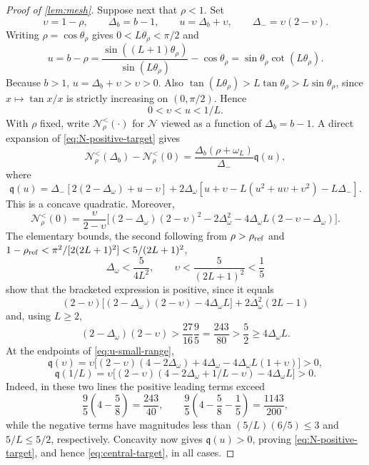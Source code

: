 \documentclass[review,hidelinks,onefignum,onetabnum]{siamart251216}
\begin{document}
\begin{proof}[Proof of \cref{lem:mesh}]
Suppose next that \(\rho<1\).  Set
\[
 \upsilon=1-\rho,\qquad \Delta_b=b-1,\qquad
 u=\Delta_b+\upsilon,\qquad \Delta_-=\upsilon(2-\upsilon).
\]
Writing \(\rho=\cos\theta_\rho\) gives
\(0<L\theta_\rho<\pi/2\) and
\[
 u=b-\rho
 =\frac{\sin((L+1)\theta_\rho)}{\sin(L\theta_\rho)}
  -\cos\theta_\rho
 =\sin\theta_\rho\cot(L\theta_\rho).
\]
Because \(b>1\), \(u=\Delta_b+\upsilon>\upsilon>0\).  Also
\(\tan(L\theta_\rho)>L\tan\theta_\rho>L\sin\theta_\rho\), since
\(x\mapsto\tan x/x\) is strictly increasing on \((0,\pi/2)\).
Hence
\begin{equation}\label{eq:u-small-range}
 0<\upsilon<u<1/L.
\end{equation}
With \(\rho\) fixed, write \(\mathcal N_\rho^{<}(\mathord\cdot)\) for
\(\mathcal N\) viewed as a function of \(\Delta_b=b-1\).
A direct expansion of \eqref{eq:N-positive-target} gives
\[
 \mathcal N_\rho^{<}(\Delta_b)-\mathcal N_\rho^{<}(0)
 =\frac{\Delta_b(\rho+\omega_L)}{\Delta_-}\mathfrak q(u),
\]
where
\[
 \mathfrak q(u)=\Delta_-[2(2-\Delta_\omega)+u-\upsilon]
 +2\Delta_\omega
 [u+\upsilon-L(u^2+u\upsilon+\upsilon^2)-L\Delta_-].
\]
This is a concave quadratic.  Moreover,
\[
 \mathcal N_\rho^{<}(0)=\frac{\upsilon}{2-\upsilon}
 \bigl[(2-\Delta_\omega)(2-\upsilon)^2
 -2\Delta_\omega^2
 -4\Delta_\omega L(2-\upsilon-\Delta_\omega)\bigr].
\]
The elementary bounds, the second following from
\(\rho>\rho_{\rm ref}\) and
\(1-\rho_{\rm ref}<\pi^2/[2(2L+1)^2]<5/(2L+1)^2\),
\begin{equation}\label{eq:Delta-upsilon-bounds}
 \Delta_\omega<\frac5{4L^2},\qquad
 \upsilon<\frac5{(2L+1)^2}<\frac15
\end{equation}
show that the bracketed expression is positive, since it equals
\[
 (2-\upsilon)
 \bigl[(2-\Delta_\omega)(2-\upsilon)-4\Delta_\omega L\bigr]
 +2\Delta_\omega^2(2L-1)
\]
and, using \(L\geq2\),
\[
 (2-\Delta_\omega)(2-\upsilon)
 >\frac{27}{16}\frac95=\frac{243}{80}
 >\frac52\geq4\Delta_\omega L.
\]
At the endpoints of
\eqref{eq:u-small-range},
\[
 \mathfrak q(\upsilon)=\upsilon
 \bigl[(2-\upsilon)(4-2\Delta_\omega)
 +4\Delta_\omega-4\Delta_\omega L(1+\upsilon)\bigr]>0,
\]
\[
 \mathfrak q(1/L)=\upsilon
 \bigl[(2-\upsilon)(4-2\Delta_\omega+1/L-\upsilon)
 -4\Delta_\omega L\bigr]>0.
\]
Indeed, in these two lines the positive leading terms exceed
\[
 \frac95\left(4-\frac58\right)=\frac{243}{40},
 \qquad
 \frac95\left(4-\frac58-\frac15\right)=\frac{1143}{200},
\]
while the negative terms have magnitudes less than
\((5/L)(6/5)\leq3\) and \(5/L\leq5/2\), respectively.  Concavity now gives
\(\mathfrak q(u)>0\), proving \eqref{eq:N-positive-target}, and hence
\eqref{eq:central-target}, in all cases.


\end{proof}
\end{document}
